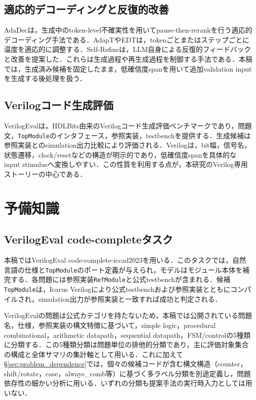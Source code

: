 \documentclass[submit,techrep,noauthor]{ipsj}
\begin{document}
\subsection{適応的デコーディングと反復的改善}

AdaDec\cite{adadec2025}は，生成中のtoken-level不確実性を用いてpause-then-rerankを行う適応的デコーディング手法である．AdapT\cite{adapt2023}やEDT\cite{edt2024}は，tokenごとまたはステップごとに温度を適応的に調整する．Self-Refine\cite{madaan2023selfrefine}は，LLM自身による反復的フィードバックと改善を提案した．これらは生成過程や再生成過程を制御する手法である．本稿では，生成済み候補を固定したまま，低確信度spanを用いて追加validation inputを生成する後処理を扱う．

\subsection{Verilogコード生成評価}

VerilogEval\cite{liu2023verilogeval}は，HDLBits由来のVerilogコード生成評価ベンチマークであり，問題文，\texttt{TopModule}のインタフェース，参照実装，testbenchを提供する．生成候補は参照実装とのsimulation出力比較により評価される．Verilogは，bit幅，信号名，状態遷移，clock/resetなどの構造が明示的であり，低確信度spanを具体的なinput stimulusへ変換しやすい．この性質を利用する点が，本研究のVerilog専用ストーリーの中心である．

\section{予備知識}

\subsection{VerilogEval code-completeタスク}

本稿ではVerilogEval code-complete-iccad2023を用いる．このタスクでは，自然言語の仕様と\texttt{TopModule}のポート定義が与えられ，モデルはモジュール本体を補完する．各問題には参照実装\texttt{RefModule}と公式testbenchが含まれる．候補\texttt{TopModule}は，Icarus Verilogにより公式testbenchおよび参照実装とともにコンパイルされ，simulation出力が参照実装と一致すれば成功と判定される．

VerilogEvalの問題は公式カテゴリを持たないため，本稿では公開されている問題名，仕様，参照実装の構文特徴に基づいて，simple logic，procedural combinational，arithmetic datapath，sequential datapath，FSM/controlの5種類に分類する．この5種類分類は問題単位の排他的分類であり，主に評価対象集合の構成と全体サマリの集計軸として用いる．これに加えて§\ref{sec:problem_dependence}では，個々の候補コードが含む構文構造（counter，shift/rotate，case，always\_comb等）に基づく多ラベル分類を別途定義し，問題依存性の細かい分析に用いる．いずれの分類も提案手法の実行時入力としては用いない．
\end{document}
